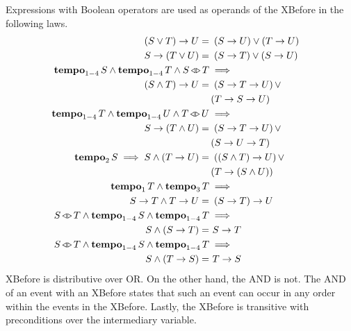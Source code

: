 Expressions with Boolean operators are used as operands of the \ac{XBefore} in the following laws.
%
\begin{subequations}
\label{thms:xbefore-boolean}
\begin{align}
\xbefore{\left(S \lor T\right)}{U} =&~
  \parsin{\xbefore{S}{U}} \lor \parsin{\xbefore{T}{U}} &
  \label{thm:xbefore-sup-1}\\
\xbefore{S}{\left(T \lor U\right)} =&~
  \parsin{\xbefore{S}{T}} \lor \parsin{\xbefore{S}{U}} &
  \label{thm:xbefore-sup-2}\\
\tempo{S} \land \tempo{T} \land \independentevents{S}{T} & \implies\nonumber \\
  \xbefore{\left(S \land T\right)}{U} =&~
  \parsin{\xbefore{\xbefore{S}{T}}{U}} \lor \nonumber\\
  &\parsin{\xbefore{\xbefore{T}{S}}{U}} &
  \label{thm:xbefore-inf-1}\\
\tempo{T} \land \tempo{U} \land \independentevents{T}{U} & \implies \nonumber\\
  \xbefore{S}{\left(T \land U\right)} =&~
  \parsin{\xbefore{S}{\xbefore{T}{U}}} \lor \nonumber\\
  &\parsin{\xbefore{S}{\xbefore{U}{T}}} &
  \label{thm:xbefore-inf-2}\\
\tempo[2]{S} \implies S \land \parsin{\xbefore{T}{U}} =&~
  \parsin{\xbefore{\parsin{S \land T}}{U}} \lor \nonumber\\
  &\parsin{\xbefore{T}{\parsin{S \land U}}} &
  \label{thm:and_xbefore_equiv_or_xbefore}\\
\tempo[1]{T} \land \tempo[3]{T} &\implies\nonumber\\
  \xbefore{S}{T} \land \xbefore{T}{U} =&~
  \xbefore{\left(\xbefore{S}{T}\right)}{U}
  & 
  \label{thm:inf_xbefore_trans}\\
\independentevents{S}{T} \land \tempo[1-4]{S} \land \tempo[1-4]{T} & \implies\nonumber\\
  S \land \left(\xbefore{S}{T}\right) =&~ \xbefore{S}{T}
  \label{thm:xbefore_inf_absorb_1}\\
\independentevents{S}{T} \land \tempo[1-4]{S} \land \tempo[1-4]{T} & \implies\nonumber\\
  S \land \left(\xbefore{T}{S}\right) =&~ \xbefore{T}{S}
  \label{thm:xbefore_inf_absorb_2}
\end{align}
\end{subequations}
%
\ac{XBefore} is distributive over \ac{OR}.
On the other hand, the \ac{AND} is not.
The \ac{AND} of an event with an \ac{XBefore} states that such an event can occur in any order within the events in the \ac{XBefore}.
Lastly, the \ac{XBefore} is transitive with preconditions over the intermediary variable.

